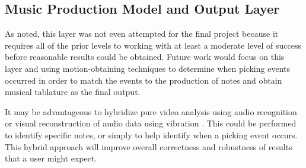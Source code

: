 \subsection{Music Production Model and Output Layer}
As noted, this layer was not even attempted for the final project because it requires all of the prior
levels to working with at least a moderate level of success before reasonable results could be obtained.
Future work would focus on this layer and using motion-obtaining techniques to determine when picking
events occurred in order to match the events to the production of notes and obtain musical tablature as
the final output.
\par
It may be advantageous to hybridize pure video analysis using audio recognition
or visual reconstruction of audio data using vibration \cite{VisualMic}.
This could be performed to identify specific notes, or simply to help identify when a picking event occurs.
This hybrid approach will improve overall correctness and robustness of results that a user might expect.
